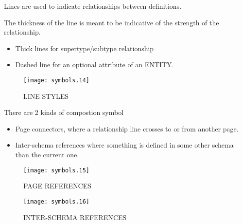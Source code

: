 \begin{remarks}
\remintro
{}

    Lines are used to indicate relationships between definitions. 

    The thickness of the line is meant to be indicative of the strength
of the relationship.

\begin{itemize}
\item Thick lines for supertype/subtype relationship
\item Dashed line for an optional attribute of an ENTITY.
\end{itemize}

\remend
\end{remarks}


\begin{figure}[hp]
\centering
\texttt{[image: symbols.14]}

\vspace{\afttit}
LINE STYLES

\end{figure}


\begin{remarks}
\remintro
{}

There are 2 kinds of compostion symbol
\begin{itemize}
\item Page connectors, where a relationship line crosses to or from
another page.
\item Inter-schema references where something is defined in some other
schema than the current one.
\end{itemize}

\remend
\end{remarks}


\begin{figure}[hp]
\centering
\texttt{[image: symbols.15]}

\vspace{\afttit}

PAGE REFERENCES

\vspace{\afttit}

\texttt{[image: symbols.16]}

\vspace{\afttit}

INTER-SCHEMA REFERENCES

\end{figure}


